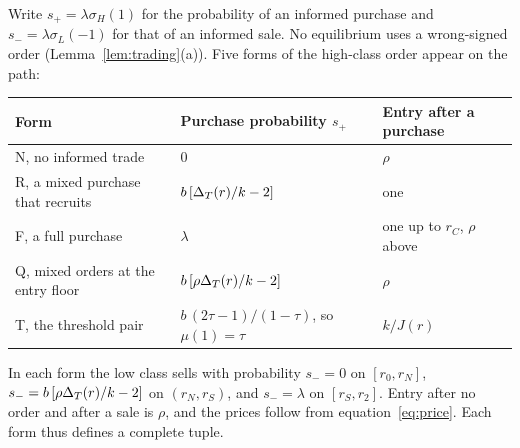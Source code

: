 Write \(s_+=\lambda\sigma_H(1)\) for the probability of an informed purchase and \(s_-=\lambda\sigma_L(-1)\) for
that of an informed sale. No equilibrium uses a wrong-signed order (Lemma~\ref{lem:trading}(a)). Five forms of the
high-class order appear on the path:
\begin{center}\small\singlespacing
\begin{tabular}{@{}lll@{}}
\toprule
Form & Purchase probability \(s_+\) & Entry after a purchase\\
\midrule
N, no informed trade & \(0\) & \(\rho\)\\
R, a mixed purchase that recruits & \(b\,[\Delta_T(r)/k-2]\) & one\\
F, a full purchase & \(\lambda\) & one up to \(r_C\), \(\rho\) above\\
Q, mixed orders at the entry floor & \(b\,[\rho\Delta_T(r)/k-2]\) & \(\rho\)\\
T, the threshold pair & \(b\,(2\tau-1)/(1-\tau)\), so \(\mu(1)=\tau\) & \(k/J(r)\)\\
\bottomrule
\end{tabular}
\end{center}
In each form the low class sells with probability \(s_-=0\) on \([r_0,r_N]\), \(s_-=b\,[\rho\Delta_T(r)/k-2]\) on
\((r_N,r_S)\), and \(s_-=\lambda\) on \([r_S,r_2]\). Entry after no order and after a sale is \(\rho\), and the
prices follow from equation~\eqref{eq:price}. Each form thus defines a complete tuple.

